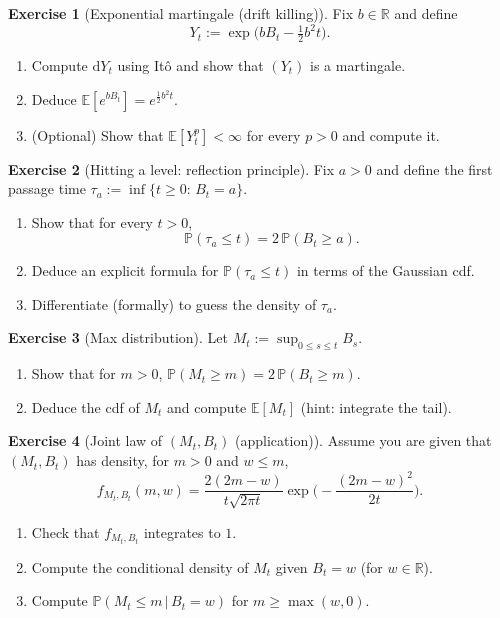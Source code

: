 \documentclass[11pt]{article}
\newcommand{\E}{\mathbb{E}}
\newcommand{\R}{\mathbb{R}}
\newcommand{\1}{\mathbf{1}}
\theoremstyle{definition}
\newtheorem{exercise}{Exercise}[section]
\begin{document}
\begin{exercise}[Exponential martingale (drift killing)]
Fix $b\in\R$ and define
$$
Y_t:=\exp\Big(bB_t-\tfrac12 b^2 t\Big).
$$
\begin{enumerate}
\item Compute $\mathrm{d} Y_t$ using It\^o and show that $(Y_t)$ is a martingale.
\item Deduce $\E[e^{bB_t}]=e^{\frac12 b^2 t}$.
\item (Optional) Show that $\E[Y_t^p]<\infty$ for every $p>0$ and compute it.
\end{enumerate}
\end{exercise}

\begin{exercise}[Hitting a level: reflection principle]
Fix $a>0$ and define the first passage time $\tau_a:=\inf\{t\ge 0:\,B_t=a\}$.
\begin{enumerate}
\item Show that for every $t>0$,
$$
\mathbb{P}(\tau_a\le t)=2\,\mathbb{P}(B_t\ge a).
$$
\item Deduce an explicit formula for $\mathbb{P}(\tau_a\le t)$ in terms of the Gaussian cdf.
\item Differentiate (formally) to guess the density of $\tau_a$.
\end{enumerate}
\end{exercise}

\begin{exercise}[Max distribution]
Let $M_t:=\sup_{0\le s\le t}B_s$.
\begin{enumerate}
\item Show that for $m>0$, $\mathbb{P}(M_t\ge m)=2\,\mathbb{P}(B_t\ge m)$.
\item Deduce the cdf of $M_t$ and compute $\E[M_t]$ (hint: integrate the tail).
\end{enumerate}
\end{exercise}

\begin{exercise}[Joint law of $(M_t,B_t)$ (application)]
Assume you are given that $(M_t,B_t)$ has density, for $m>0$ and $w\le m$,
$$
f_{M_t,B_t}(m,w)=\frac{2(2m-w)}{t\sqrt{2\pi t}}
\exp\!\Big(-\frac{(2m-w)^2}{2t}\Big).
$$
\begin{enumerate}
\item Check that $f_{M_t,B_t}$ integrates to $1$.
\item Compute the conditional density of $M_t$ given $B_t=w$ (for $w\in\R$).
\item Compute $\mathbb{P}(M_t\le m\,|\,B_t=w)$ for $m\ge \max(w,0)$.
\end{enumerate}
\end{exercise}
\end{document}
